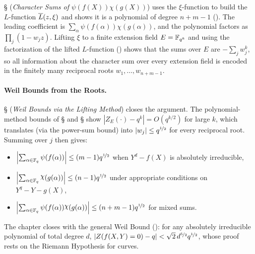 \S {} (\emph{Character Sums of $\psi(f(X))\chi(g(X))$}) uses the $\xi$-function to build the $L$-function $\overline{L}(z,\xi)$ and shows it is a polynomial of degree $n+m-1$ (\LXiFinitethm). The leading coefficient is $\sum_\alpha\psi(f(\alpha))\chi(g(\alpha))$, and the polynomial factors as $\prod_j(1-w_jz)$. Lifting $\xi$ to a finite extension field $E=\mathbb{F}_{q^k}$ and using the factorization of the lifted $L$-function (\LiftedLFactthm) shows that the sums over $E$ are $-\sum_j w_j^k$, so all information about the character sum over every extension field is encoded in the finitely many reciprocal roots $w_1,\dots,w_{n+m-1}$.

\paragraph*{Weil Bounds from the Roots.}
\S {} (\emph{Weil Bounds via the Lifting Method}) closes the argument. The polynomial-method bounds of \S {} and \S {} show $|Z_E(\cdot)-q^k|=O(q^{k/2})$ for large $k$, which translates (via the power-sum bound) into $|w_j|\leq q^{\nicefrac12}$ for every reciprocal root. Summing over $j$ then gives:
\begin{itemize}
  \item $\left|\sum_{\alpha\in\mathbb{F}_q}\psi(f(\alpha))\right|\leq (m-1)q^{\nicefrac12}$ when $Y^d-f(X)$ is absolutely irreducible,
  \item $\lt|\sum_{\alpha\in\bbF_q}\chi(g(\alpha))\rt|\leq (n-1)q^{\nicefrac12}$ under appropriate conditions on $Y^q-Y-g(X)$,
  \item $\lt|\sum_{\alpha\in\bbF_q}\psi(f(\alpha))\chi(g(\alpha))\rt|\leq (n+m-1)q^{\nicefrac12}$ for mixed sums.
\end{itemize}
The chapter closes with the general Weil Bound (\Weil): for any absolutely irreducible polynomial of total degree $d$, $|Z(f(X,Y)=0)-q|<\sqrt2\,d^{\nicefrac52}q^{\nicefrac12}$, whose proof rests on the Riemann Hypothesis for curves.





